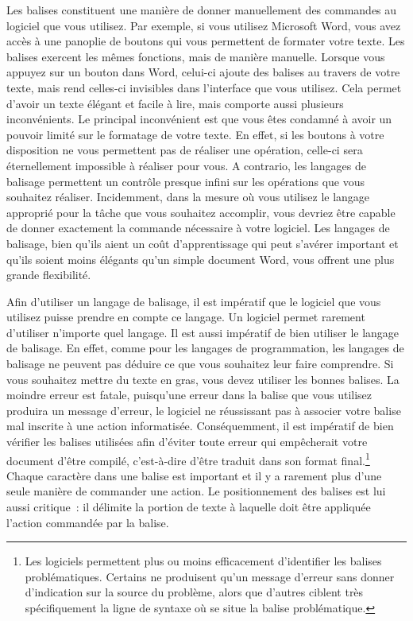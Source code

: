 \documentclass[
  letterpaper,
  DIV=11,
  numbers=noendperiod]{scrreprt}
\begin{document}
Les balises constituent une manière de donner manuellement des commandes
au logiciel que vous utilisez. Par exemple, si vous utilisez Microsoft
Word, vous avez accès à une panoplie de boutons qui vous permettent de
formater votre texte. Les balises exercent les mêmes fonctions, mais de
manière manuelle. Lorsque vous appuyez sur un bouton dans Word, celui-ci
ajoute des balises au travers de votre texte, mais rend celles-ci
invisibles dans l'interface que vous utilisez. Cela permet d'avoir un
texte élégant et facile à lire, mais comporte aussi plusieurs
inconvénients. Le principal inconvénient est que vous êtes condamné à
avoir un pouvoir limité sur le formatage de votre texte. En effet, si
les boutons à votre disposition ne vous permettent pas de réaliser une
opération, celle-ci sera éternellement impossible à réaliser pour vous.
A contrario, les langages de balisage permettent un contrôle presque
infini sur les opérations que vous souhaitez réaliser. Incidemment, dans
la mesure où vous utilisez le langage approprié pour la tâche que vous
souhaitez accomplir, vous devriez être capable de donner exactement la
commande nécessaire à votre logiciel. Les langages de balisage, bien
qu'ils aient un coût d'apprentissage qui peut s'avérer important et
qu'ils soient moins élégants qu'un simple document Word, vous offrent
une plus grande flexibilité.

Afin d'utiliser un langage de balisage, il est impératif que le logiciel
que vous utilisez puisse prendre en compte ce langage. Un logiciel
permet rarement d'utiliser n'importe quel langage. Il est aussi
impératif de bien utiliser le langage de balisage. En effet, comme pour
les langages de programmation, les langages de balisage ne peuvent pas
déduire ce que vous souhaitez leur faire comprendre. Si vous souhaitez
mettre du texte en gras, vous devez utiliser les bonnes balises. La
moindre erreur est fatale, puisqu'une erreur dans la balise que vous
utilisez produira un message d'erreur, le logiciel ne réussissant pas à
associer votre balise mal inscrite à une action informatisée.
Conséquemment, il est impératif de bien vérifier les balises utilisées
afin d'éviter toute erreur qui empêcherait votre document d'être
compilé, c'est-à-dire d'être traduit dans son format final.\footnote{Les
  logiciels permettent plus ou moins efficacement d'identifier les
  balises problématiques. Certains ne produisent qu'un message d'erreur
  sans donner d'indication sur la source du problème, alors que d'autres
  ciblent très spécifiquement la ligne de syntaxe où se situe la balise
  problématique.} Chaque caractère dans une balise est important et il y
a rarement plus d'une seule manière de commander une action. Le
positionnement des balises est lui aussi critique~: il délimite la
portion de texte à laquelle doit être appliquée l'action commandée par
la balise.
\end{document}
